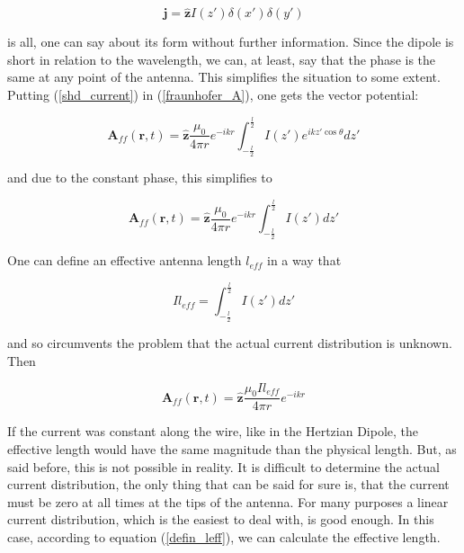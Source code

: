 \documentclass[a4paper,14pt]{extbook}
\begin{document}
\begin{equation}\label{shd_current}
 \mathbf{j} = \mathbf{\hat{z}} I(z') \delta (x') \delta (y')
\end{equation}

is all, one can say about its form without further information. Since the dipole is short in relation to the wavelength, we can, at least, say that the phase is the same at any point of the antenna. This simplifies the situation to some extent. Putting (\ref{shd_current}) in (\ref{fraunhofer_A}), one gets the vector potential:

\begin{equation}\label{shd_A}
 \mathbf{A}_{ff}(\mathbf{r},t) = \mathbf{\hat{z} }\frac{\mu_0}{4 \pi r} e^{-ikr} \int_{-\frac{l}{2}}^{\frac{l}{2}} I(z') e^{ik z'\cos \theta } dz'
\end{equation}

and due to the constant phase, this simplifies to

\begin{equation}\label{shd_A_simpl}
\mathbf{A}_{ff}(\mathbf{r},t) = \mathbf{\hat{z}} \frac{\mu_0}{4 \pi r} e^{-ikr} \int_{-\frac{l}{2}}^{\frac{l}{2}} I(z') dz'
\end{equation}

One can define an effective antenna length $l_{eff}$ in a way that

\begin{equation}\label{defin_leff}
Il_{eff}= \int_{-\frac{l}{2}}^{\frac{l}{2}} I(z') dz'
\end{equation}

and so circumvents the problem that the actual current distribution is unknown. Then

\begin{equation}\label{shd_A_solution}
\mathbf{A}_{ff}(\mathbf{r},t) = \mathbf{\hat{z}} \frac{\mu_0 I l_{eff}}{4 \pi r} e^{-ikr}
\end{equation}

If the current was constant along the wire, like in the Hertzian Dipole, the effective length would have the same magnitude than the physical length. But, as said before, this is not possible in reality. It is difficult to determine the actual current distribution, the only thing that can be said for sure is, that the current must be zero at all times at the tips of the antenna. For many purposes a linear current distribution, which is the easiest to deal with, is good enough. In this case, according to equation (\ref{defin_leff}), we can calculate the effective length.
\end{document}
